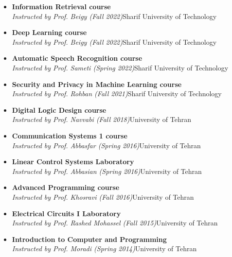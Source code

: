 \documentclass[10pt]{article}
\newenvironment{innerlist}[1][\enskip\textbullet]%
        {\begin{itemize}[#1,leftmargin=*,parsep=0pt,itemsep=0pt,topsep=0pt,partopsep=0pt]}
        {\end{itemize}}
\begin{document}
\begin{innerlist}



\item[] \textbf{Information Retrieval course}  
\\
\textit{Instructed by Prof. Beigy (Fall 2022)}\hfill{Sharif University of Technology} 
\item[] \textbf{Deep Learning course}  
\\
\textit{Instructed by Prof. Beigy (Fall 2022)}\hfill{Sharif University of Technology} 

\item[] \textbf{Automatic Speech Recognition course}  
\\
\textit{Instructed by Prof. Sameti (Spring 2022)}\hfill{Sharif University of Technology} 

\item[] \textbf{Security and Privacy in Machine Learning course}
\\
\textit{Instructed by Prof. Rohban (Fall 2021)}\hfill{Sharif University of Technology}  

\item[] \textbf{Digital Logic Design course}
\\
\textit{Instructed by Prof. Navvabi (Fall 2018)}\hfill{University of Tehran}  

\item[] \textbf{Communication Systems 1 course}
\\
\textit{Instructed by Prof. Abbasfar (Spring 2016)}\hfill{University of Tehran}

\item[] \textbf{Linear Control Systems Laboratory}
\\
\textit{Instructed by Prof. Abbasian (Spring 2016)}\hfill{University of Tehran}

\item[] \textbf{Advanced Programming course}
\\
\textit{Instructed by Prof. Khosravi (Fall 2016)}\hfill{University of Tehran}

\item[] \textbf{Electrical Circuits I Laboratory}
\\
\textit{Instructed by Prof. Rashed Mohassel (Fall 2015)}\hfill{University of Tehran}

\item[] \textbf{Introduction to Computer and Programming}
\\
\textit{Instructed by Prof. Moradi (Spring 2014)}\hfill{University of Tehran}

\end{innerlist}
\end{document}
